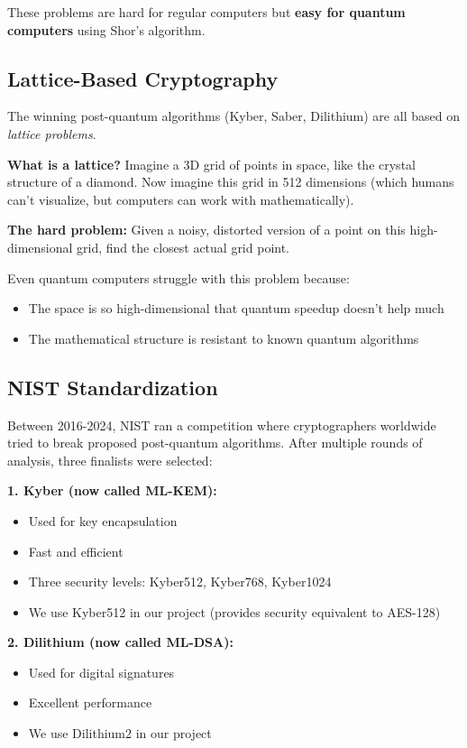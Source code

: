 \documentclass[12pt,a4paper]{report}
\begin{document}
These problems are hard for regular computers but \textbf{easy for quantum computers} using Shor's algorithm.

\subsection{Lattice-Based Cryptography}

The winning post-quantum algorithms (Kyber, Saber, Dilithium) are all based on \textit{lattice problems}.

\textbf{What is a lattice?} Imagine a 3D grid of points in space, like the crystal structure of a diamond. Now imagine this grid in 512 dimensions (which humans can't visualize, but computers can work with mathematically).

\textbf{The hard problem:} Given a noisy, distorted version of a point on this high-dimensional grid, find the closest actual grid point.

Even quantum computers struggle with this problem because:
\begin{itemize}
\item The space is so high-dimensional that quantum speedup doesn't help much
\item The mathematical structure is resistant to known quantum algorithms
\end{itemize}

\subsection{NIST Standardization}

Between 2016-2024, NIST ran a competition where cryptographers worldwide tried to break proposed post-quantum algorithms. After multiple rounds of analysis, three finalists were selected:

\textbf{1. Kyber (now called ML-KEM):}
\begin{itemize}
\item Used for key encapsulation
\item Fast and efficient
\item Three security levels: Kyber512, Kyber768, Kyber1024
\item We use Kyber512 in our project (provides security equivalent to AES-128)
\end{itemize}

\textbf{2. Dilithium (now called ML-DSA):}
\begin{itemize}
\item Used for digital signatures
\item Excellent performance
\item We use Dilithium2 in our project
\end{itemize}
\end{document}
